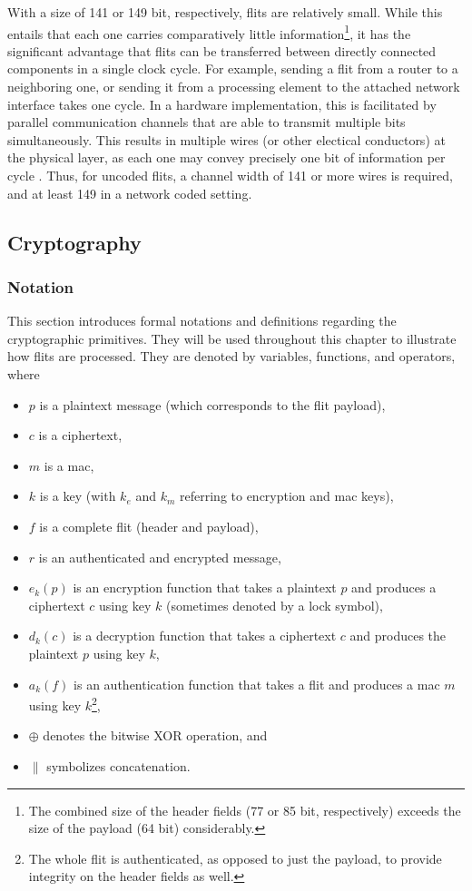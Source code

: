 With a size of 141 or 149 bit, respectively, flits are relatively small. While this entails that each one carries comparatively little
information\footnote{The combined size of the header fields (77 or 85 bit, respectively) exceeds the size of the payload (64 bit) considerably.}, it
has the significant advantage that flits can be transferred between directly connected components in a single clock
cycle. For example, sending a flit from a router to a neighboring one, or sending it from a processing element
to the attached network interface takes one cycle. In a hardware implementation, this is facilitated by parallel communication channels that are able
to transmit multiple bits simultaneously. This results in multiple wires (or other electical conductors) at the physical layer, as each one may convey
precisely one bit of information per cycle \cite{wikiparallelcomm}. Thus, for uncoded flits, a channel width of 141 or more wires is required, and at least 149
in a network coded setting.

\subsection{Cryptography}\label{subsec:crypto}
\subsubsection{Notation}\label{subsubsec:cryptonotation}
This section introduces formal notations and definitions regarding the cryptographic primitives. They will be used throughout this chapter to
illustrate how flits are processed. They are denoted by variables, functions, and operators, where
\begin{itemize}
    \item $p$ is a plaintext message (which corresponds to the flit payload),
    \item $c$ is a ciphertext,
    \item $m$ is a \gls{mac},
    \item $k$ is a key (with $k_e$ and $k_m$ referring to encryption and \gls{mac} keys),
    \item $f$ is a complete flit (header and payload),
    \item $r$ is an authenticated and encrypted message,
    \item $e_k(p)$ is an encryption function that takes a plaintext $p$ and produces a ciphertext $c$ using key $k$ (sometimes denoted by a lock
        symbol),
    \item $d_k(c)$ is a decryption function that takes a ciphertext $c$ and produces the plaintext $p$ using key $k$,
    \item $a_k(f)$ is an authentication function that takes a flit and produces a \gls{mac} $m$ using key $k$\footnote{The whole flit is
        authenticated, as opposed to just the payload, to provide integrity on the header fields as well.},
    \item $\oplus$ denotes the bitwise XOR operation, and
    \item $\|$ symbolizes concatenation.
\end{itemize}
\vspace{0.5\baselineskip}

